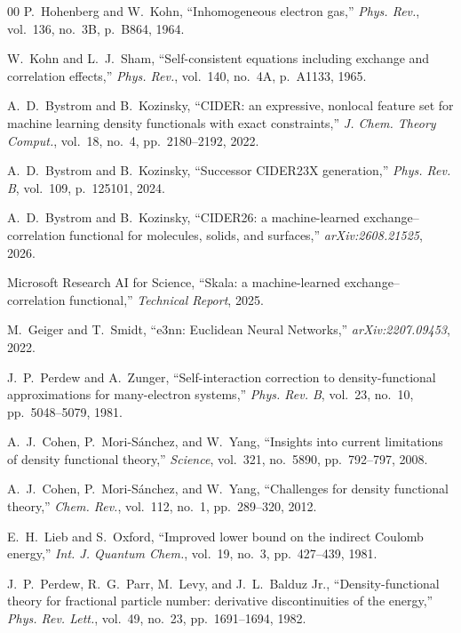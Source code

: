 \documentclass[journal]{IEEEtran}
\begin{document}
\begin{thebibliography}{00}
P.~Hohenberg and W.~Kohn, ``Inhomogeneous electron gas,'' \textit{Phys. Rev.}, vol.~136, no.~3B, p.~B864, 1964.

W.~Kohn and L.~J.~Sham, ``Self-consistent equations including exchange and correlation effects,'' \textit{Phys. Rev.}, vol.~140, no.~4A, p.~A1133, 1965.

A.~D.~Bystrom and B.~Kozinsky, ``CIDER: an expressive, nonlocal feature set for machine learning density functionals with exact constraints,'' \textit{J. Chem. Theory Comput.}, vol.~18, no.~4, pp.~2180--2192, 2022.

A.~D.~Bystrom and B.~Kozinsky, ``Successor CIDER23X generation,'' \textit{Phys. Rev. B}, vol.~109, p.~125101, 2024.

A.~D.~Bystrom and B.~Kozinsky, ``CIDER26: a machine-learned exchange--correlation functional for molecules, solids, and surfaces,'' \textit{arXiv:2608.21525}, 2026.

Microsoft Research AI for Science, ``Skala: a machine-learned exchange--correlation functional,'' \textit{Technical Report}, 2025.

M.~Geiger and T.~Smidt, ``e3nn: Euclidean Neural Networks,'' \textit{arXiv:2207.09453}, 2022.

J.~P.~Perdew and A.~Zunger, ``Self-interaction correction to density-functional approximations for many-electron systems,'' \textit{Phys. Rev. B}, vol.~23, no.~10, pp.~5048--5079, 1981.

A.~J.~Cohen, P.~Mori-S\'anchez, and W.~Yang, ``Insights into current limitations of density functional theory,'' \textit{Science}, vol.~321, no.~5890, pp.~792--797, 2008.

A.~J.~Cohen, P.~Mori-S\'anchez, and W.~Yang, ``Challenges for density functional theory,'' \textit{Chem. Rev.}, vol.~112, no.~1, pp.~289--320, 2012.

E.~H.~Lieb and S.~Oxford, ``Improved lower bound on the indirect Coulomb energy,'' \textit{Int. J. Quantum Chem.}, vol.~19, no.~3, pp.~427--439, 1981.

J.~P.~Perdew, R.~G.~Parr, M.~Levy, and J.~L.~Balduz Jr., ``Density-functional theory for fractional particle number: derivative discontinuities of the energy,'' \textit{Phys. Rev. Lett.}, vol.~49, no.~23, pp.~1691--1694, 1982.


\end{thebibliography}
\end{document}

